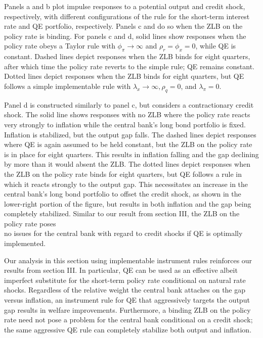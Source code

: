 \documentclass[10pt]{article}
\begin{document}
Panels a and b plot impulse responses to a potential output and credit shock, respectively, with different configurations of the rule for the short-term interest rate and QE portfolio, respectively. Panels c and do so when the ZLB on the policy rate is binding. For panels c and d, solid lines show responses when the policy rate obeys a Taylor rule with $\phi_{\pi} \rightarrow \infty$ and $\rho_{r}=\phi_{x}=0$, while QE is constant. Dashed lines depict responses when the ZLB binds for eight quarters, after which time the policy rate reverts to the simple rule; QE remains constant. Dotted lines depict responses when the ZLB binds for eight quarters, but QE follows a simple implementable rule with $\lambda_{x} \rightarrow \infty, \rho_{q}=0$, and $\lambda_{\pi}=0$.

Panel d is constructed similarly to panel c, but considers a contractionary credit shock. The solid line shows responses with no ZLB where the policy rate reacts very strongly to inflation while the central bank's long bond portfolio is fixed. Inflation is stabilized, but the output gap falls. The dashed lines depict responses where QE is again assumed to be held constant, but the ZLB on the policy rate is in place for eight quarters. This results in inflation falling and the gap declining\\
by more than it would absent the ZLB. The dotted lines depict responses when the ZLB on the policy rate binds for eight quarters, but QE follows a rule in which it reacts strongly to the output gap. This necessitates an increase in the central bank's long bond portfolio to offset the credit shock, as shown in the lower-right portion of the figure, but results in both inflation and the gap being completely stabilized. Similar to our result from section III, the ZLB on the policy rate poses\\
no issues for the central bank with regard to credit shocks if QE is optimally implemented.

Our analysis in this section using implementable instrument rules reinforces our results from section III. In particular, QE can be used as an effective albeit imperfect substitute for the short-term policy rate conditional on natural rate shocks. Regardless of the relative weight the central bank attaches on the gap versus inflation, an instrument rule for QE that aggressively targets the output gap results in welfare improvements. Furthermore, a binding ZLB on the policy rate need not pose a problem for the central bank conditional on a credit shock; the same aggressive QE rule can completely stabilize both output and inflation.
\end{document}
